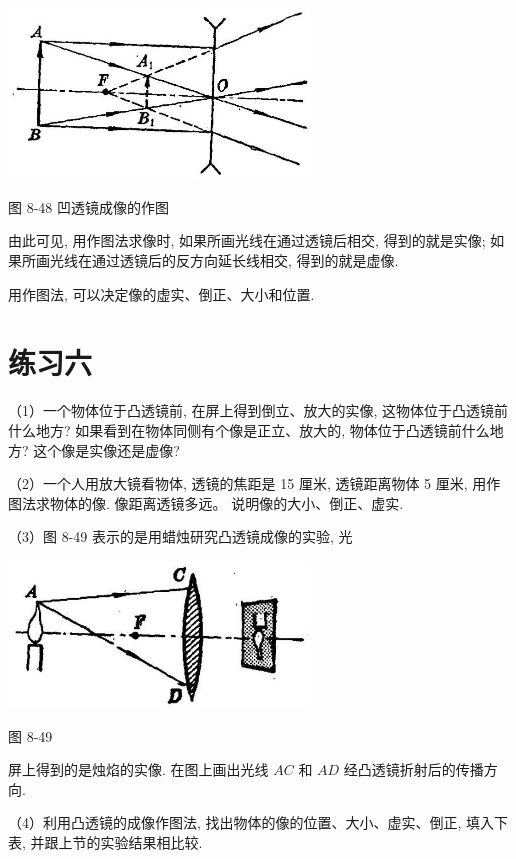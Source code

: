 \documentclass[10pt]{article}
\begin{document}
\begin{center}
\includegraphics[max width=0.6\textwidth]{images/01913056-1f15-74d8-9184-9aab52c9d66b_280_535140.jpg}
\end{center}

图 8-48 凹透镜成像的作图

由此可见, 用作图法求像时, 如果所画光线在通过透镜后相交, 得到的就是实像; 如果所画光线在通过透镜后的反方向延长线相交, 得到的就是虚像.

用作图法, 可以决定像的虚实、倒正、大小和位置.

\section*{练习六}

（1）一个物体位于凸透镜前, 在屏上得到倒立、放大的实像, 这物体位于凸透镜前什么地方? 如果看到在物体同侧有个像是正立、放大的, 物体位于凸透镜前什么地方? 这个像是实像还是虚像?

（2）一个人用放大镜看物体, 透镜的焦距是 15 厘米, 透镜距离物体 5 厘米, 用作图法求物体的像. 像距离透镜多远。 说明像的大小、倒正、虚实.

（3）图 8-49 表示的是用蜡烛研究凸透镜成像的实验, 光

\begin{center}
\includegraphics[max width=0.6\textwidth]{images/01913056-1f15-74d8-9184-9aab52c9d66b_281_871476.jpg}
\end{center}

图 8-49

屏上得到的是烛焰的实像. 在图上画出光线 \({AC}\) 和 \({AD}\) 经凸透镜折射后的传播方向.

（4）利用凸透镜的成像作图法, 找出物体的像的位置、大小、虚实、倒正, 填入下表, 并跟上节的实验结果相比较.
\end{document}

